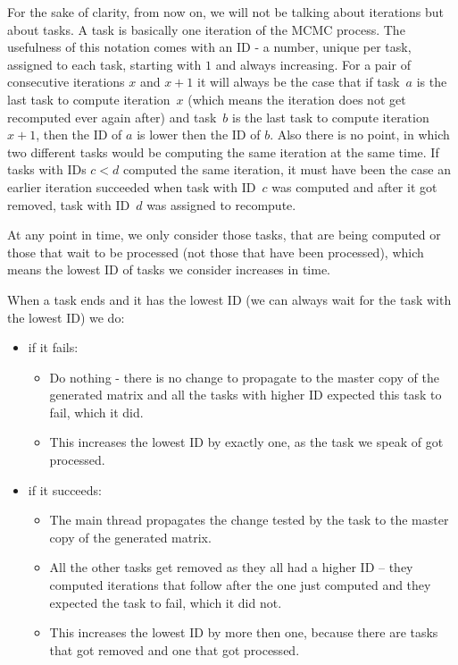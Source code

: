 For the sake of clarity, from now on, we will not be talking about iterations but about tasks. A task is basically one iteration of the MCMC process. The usefulness of this notation comes with an ID - a number, unique per task, assigned to each task, starting with $1$ and always increasing. For a pair of consecutive iterations $x$ and $x+1$ it will always be the case that if task~$a$ is the last task to compute iteration~$x$ (which means the iteration does not get recomputed ever again after) and task~$b$ is the last task to compute iteration~$x+1$, then the ID of $a$ is lower then the ID of $b$. Also there is no point, in which two different tasks would be computing the same iteration at the same time. If tasks with IDs $c<d$ computed the same iteration, it must have been the case an earlier iteration succeeded when task with ID~$c$ was computed and after it got removed, task with ID~$d$ was assigned to recompute.

At any point in time, we only consider those tasks, that are being computed or those that wait to be processed (not those that have been processed), which means the lowest ID of tasks we consider increases in time.

When a task ends and it has the lowest ID (we can always wait for the task with the lowest ID) we do:
\begin{itemize}
\item if it fails:
\begin{itemize}
\item Do nothing - there is no change to propagate to the master copy of the generated matrix and all the tasks with higher ID expected this task to fail, which it did.
\item This increases the lowest ID by exactly one, as the task we speak of got processed.
\end{itemize}
\item if it succeeds: 
\begin{itemize}
\item The main thread propagates the change tested by the task to the master copy of the generated matrix.
\item All the other tasks get removed as they all had a higher ID -- they computed iterations that follow after the one just computed and they expected the task to fail, which it did not.
\item This increases the lowest ID by more then one, because there are tasks that got removed and one that got processed.
\end{itemize}
\end{itemize}


